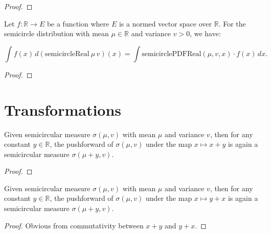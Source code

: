 \begin{proof}
\leanok
\end{proof}

\begin{lemma}
  \label{lem:integral_semicircleReal_eq_integral_smul}
  \leanok

  Let $ f : \mathbb{R} \to E $ be a function where $ E $ is a normed vector space over $\mathbb{R}$. For the semicircle distribution with mean $\mu \in \mathbb{R}$ and variance $ v > 0 $, we have:

  \[
  \int f(x) \, d(\mathrm{semicircleReal}\ \mu\, v)(x) = \int \mathrm{semicirclePDFReal}(\mu, v, x) \cdot f(x) \, dx.
  \]
  
  
\end{lemma}

\begin{proof}
\leanok
\end{proof}



\section{Transformations}

\begin{lemma}
  \label{lem:semicircleReal_map_add_const}
  \notready
  Given semicircular measure $\sigma(\mu, v)$ with mean $\mu$ and variance $v$, then for any constant $y \in \mathbb{R}$, the pushforward
  of $\sigma(\mu, v)$ under the map $x \mapsto x + y$ is again a semicircular measure $\sigma(\mu + y, v)$. 
  \begin{proof}
  \end{proof}
\end{lemma}


\begin{lemma}
  \label{lem:semicircleReal_map_const_add}
  \leanok
  Given semicircular measure $\sigma(\mu, v)$ with mean $\mu$ and variance $v$, then for any constant $y \in \mathbb{R}$, the pushforward
  of $\sigma(\mu, v)$ under the map $x \mapsto y + x$ is again a semicircular measure $\sigma(\mu + y, v)$. 
  \begin{proof}
    Obvious from commutativity between $x + y$ and $y + x$.
  \end{proof}
\end{lemma}


